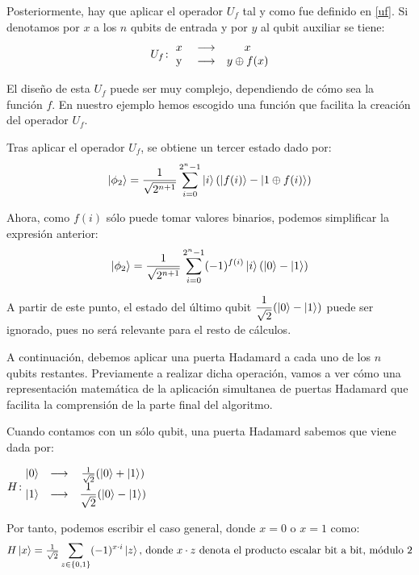 Posteriormente, hay que aplicar el operador $U_f$ tal y como fue definido en \ref{uf}. Si denotamos por $x$ a los $n$ qubits de entrada y por $y$ al qubit auxiliar se tiene:
\begin{equation}
U_f\colon \begin{matrix}x&\longrightarrow& x\\ \mathrm{\ y\ }&\longrightarrow& y\oplus f(x)\end{matrix}
\end{equation}

El diseño de esta $U_f$ puede ser muy complejo, dependiendo de cómo sea la función $f$. En nuestro ejemplo hemos escogido una función que facilita la creación del operador $U_f$.

Tras aplicar el operador $U_f$, se obtiene un tercer estado dado por:
\begin{equation}
\left|\phi_2\right\rangle = \dfrac{1}{\sqrt{2^{n+1}}} \sum\limits_{i=0}^{2^n - 1} \left|i\right\rangle(\left|f(i)\right\rangle-\left|1\oplus f(i)\right\rangle) 
\end{equation}

Ahora, como $f(i)$ sólo puede tomar valores binarios, podemos simplificar la expresión anterior:
\begin{equation}
\left|\phi_2\right\rangle = \dfrac{1}{\sqrt{2^{n+1}}} \sum\limits_{i=0}^{2^n - 1} (-1)^{f(i)}\left|i\right\rangle(\left|0\right\rangle-\left|1\right\rangle) 
\label{phi2}
\end{equation}


A partir de este punto, el estado del último qubit $\dfrac{1}{\sqrt{2}}(\left|0\right\rangle-\left|1\right\rangle)$ puede ser ignorado, pues no será relevante para el resto de cálculos.

A continuación, debemos aplicar una puerta Hadamard a cada uno de los $n$ qubits restantes. Previamente a realizar dicha operación, vamos a ver cómo una representación matemática de la aplicación simultanea de puertas Hadamard que facilita la comprensión de la parte final del algoritmo.

Cuando contamos con un sólo qubit, una puerta Hadamard sabemos que viene dada por: \begin{center}
$H\colon \begin{matrix}\left|0\right\rangle&\longrightarrow& \tfrac{1}{\sqrt{2}}(\left|0\right\rangle+\left|1\right\rangle)\\ \left|1\right\rangle&\longrightarrow& \dfrac{1}{\sqrt{2}}(\left|0\right\rangle-\left|1\right\rangle)\end{matrix}$
\end{center}

Por tanto, podemos escribir el caso general, donde $x=0$ o $x=1$ como:
\begin{equation}
H\left|x\right\rangle = \tfrac{1}{\sqrt{2}}\sum\limits_{z\in\{0,1\}} (-1)^{x\cdot i}\left|z\right\rangle \textrm{, donde $x\cdot z$ denota el producto escalar bit a bit, módulo 2}
\end{equation}


